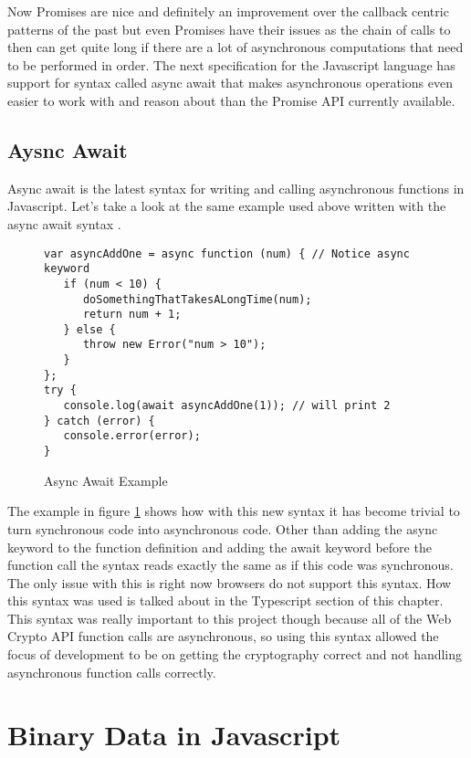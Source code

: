 Now Promises are nice and definitely an improvement over the callback centric patterns of the past but even Promises have their issues as the chain of calls to then can get quite long if there are a lot of asynchronous computations that need to be performed in order. The next specification for the Javascript language has support for syntax called async await that makes asynchronous operations even easier to work with and reason about than the Promise API currently available.


\subsection{Aysnc Await}


Async await is the latest syntax for writing and calling asynchronous functions in Javascript. Let's take a look at the same example used above written with the async await syntax \cite{js-asyncawait}.

\begin{figure}[!htbp]
\centering
\begin{lstlisting}[basicstyle=\small]
var asyncAddOne = async function (num) { // Notice async keyword
   if (num < 10) {
      doSomethingThatTakesALongTime(num);
      return num + 1;
   } else {
      throw new Error("num > 10");
   }   
};   
try {
   console.log(await asyncAddOne(1)); // will print 2
} catch (error) {
   console.error(error);
}
\end{lstlisting}
\caption{Async Await Example}
\label{fig:asyncawait}
\end{figure}

The example in figure \ref{fig:asyncawait} shows how with this new syntax it has become trivial to turn synchronous code into asynchronous code. Other than adding the async keyword to the function definition and adding the await keyword before the function call the syntax reads exactly the same as if this code was synchronous. The only issue with this is right now browsers do not support this syntax. How this syntax was used is talked about in the Typescript section of this chapter. This syntax was really important to this project though because all of the Web Crypto API function calls are asynchronous, so using this syntax allowed the focus of development to be on getting the cryptography correct and not handling asynchronous function calls correctly.


\section{Binary Data in Javascript}


